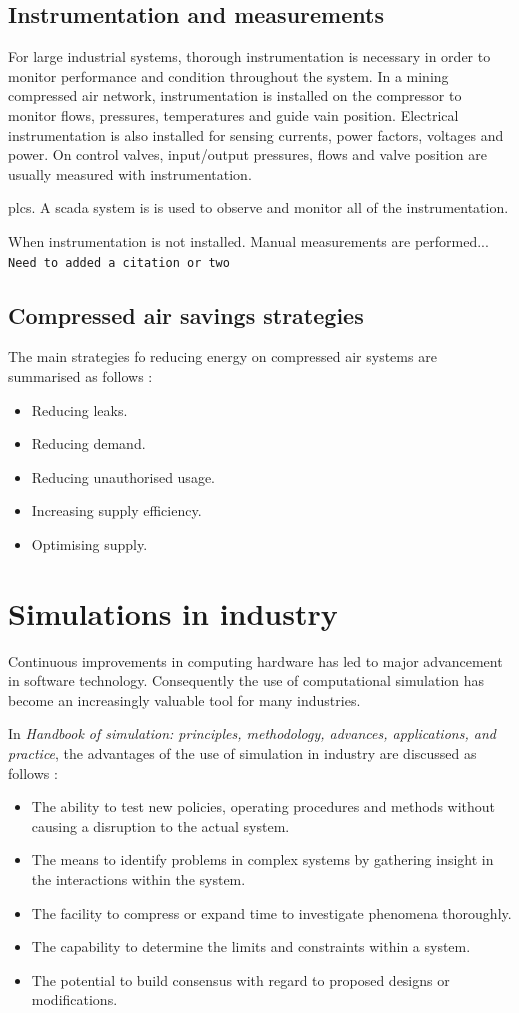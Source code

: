 	\subsection{Instrumentation and measurements}
		For large industrial systems, thorough instrumentation is necessary in order to monitor performance and condition throughout the system. In a mining compressed air network, instrumentation is installed on the compressor to monitor flows, pressures, temperatures and guide vain position. Electrical instrumentation is also installed for sensing currents, power factors, voltages and power. On control valves, input/output pressures, flows and valve position are usually measured with instrumentation.	
		\par
		\Glspl{plc}. A \gls{scada} system is is used to observe and monitor all of the instrumentation. 
		\par
		When instrumentation is not installed. Manual measurements are performed...
		\texttt{Need to added a citation or two}
	\subsection{Compressed air savings strategies}
		The main strategies fo reducing energy on compressed air systems are summarised as follows \cite{Snyman2011Masters}:
		\begin{itemize}
			\item Reducing leaks.
			\item Reducing demand.
			\item Reducing unauthorised usage.
			\item Increasing supply efficiency.
			\item Optimising supply.
		\end{itemize}
	\section{Simulations in industry}
		Continuous improvements in computing hardware has led to major advancement in software technology. Consequently the use of computational simulation has become an increasingly valuable tool for many industries.\cite{kocsis2003integration} \par 
		In \textit{ Handbook of simulation: principles, methodology, advances, applications, and practice}, the advantages of the use of simulation in industry are discussed as follows \cite{banks1998handbook}: 
		\begin{itemize}
			\item The ability to test new policies, operating procedures and methods without causing a disruption to the actual system.
			\item The means to identify problems in complex systems by gathering insight in the interactions within the system.
			\item The facility to compress or expand time to investigate phenomena thoroughly.
			\item The capability to determine the limits and constraints within a system.
			\item The potential to build consensus with regard to proposed designs or modifications.
		\end{itemize}
